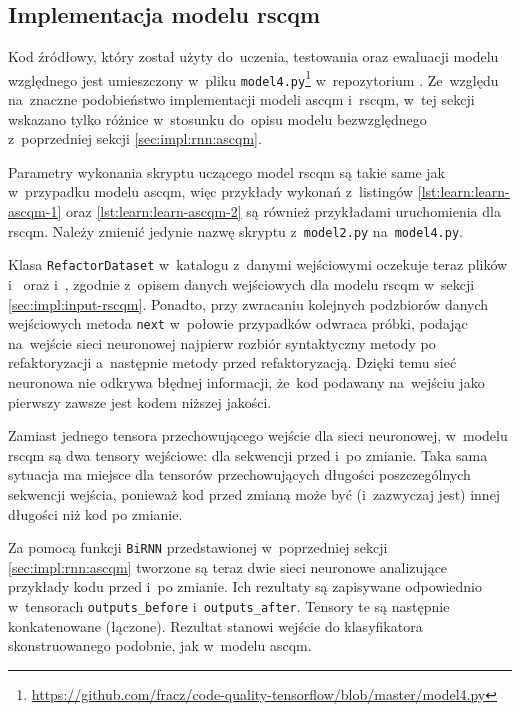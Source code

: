 \documentclass[twoside]{praca}
\begin{document}
\subsection{Implementacja modelu \gls{rscqm}}
\label{sec:impl:rnn:rscqm}

Kod źródłowy, który został użyty do~uczenia, testowania oraz ewaluacji modelu względnego jest umieszczony w~pliku \texttt{model4.py}\footnote{\url{https://github.com/fracz/code-quality-tensorflow/blob/master/model4.py}} w~repozytorium \cite{fracz:code-quality-tf}. Ze~względu na~znaczne podobieństwo implementacji modeli \gls{ascqm} i~\gls{rscqm}, w~tej sekcji wskazano tylko różnice w~stosunku do~opisu modelu bezwzględnego z~poprzedniej sekcji \ref{sec:impl:rnn:ascqm}.

Parametry wykonania skryptu uczącego model \gls{rscqm} są takie same jak w~przypadku modelu \gls{ascqm}, więc przykłady wykonań z~listingów \ref{lst:learn:learn-ascqm-1} oraz \ref{lst:learn:learn-ascqm-2} są również przykładami uruchomienia dla \gls{rscqm}. Należy zmienić jedynie nazwę skryptu z~\texttt{model2.py} na~\texttt{model4.py}.

Klasa \texttt{RefactorDataset} w~katalogu z~danymi wejściowymi oczekuje teraz plików  i~ oraz  i~, zgodnie z~opisem danych wejściowych dla modelu \gls{rscqm} w~sekcji \ref{sec:impl:input-rscqm}. Ponadto, przy zwracaniu kolejnych podzbiorów danych wejściowych metoda \texttt{next} w~połowie przypadków odwraca próbki, podając na~wejście sieci neuronowej najpierw rozbiór syntaktyczny metody po refaktoryzacji a~następnie metody przed refaktoryzacją. Dzięki temu sieć neuronowa nie odkrywa błędnej informacji, że~kod podawany na~wejściu jako pierwszy zawsze jest kodem niższej jakości.

Zamiast jednego tensora przechowującego wejście dla sieci neuronowej, w~modelu \gls{rscqm} są dwa tensory wejściowe: dla sekwencji przed i~po zmianie. Taka sama sytuacja ma miejsce dla tensorów przechowujących długości poszczególnych sekwencji wejścia, ponieważ kod przed zmianą może być (i~zazwyczaj jest) innej długości niż kod po zmianie.

Za pomocą funkcji \texttt{BiRNN} przedstawionej w~poprzedniej sekcji \ref{sec:impl:rnn:ascqm} tworzone są teraz dwie sieci neuronowe analizujące przykłady kodu przed i~po zmianie. Ich rezultaty są zapisywane odpowiednio w~tensorach \texttt{outputs\_before} i~\texttt{outputs\_after}. Tensory te są następnie konkatenowane (łączone). Rezultat stanowi wejście do klasyfikatora skonstruowanego podobnie, jak w~modelu \gls{ascqm}.
\end{document}
